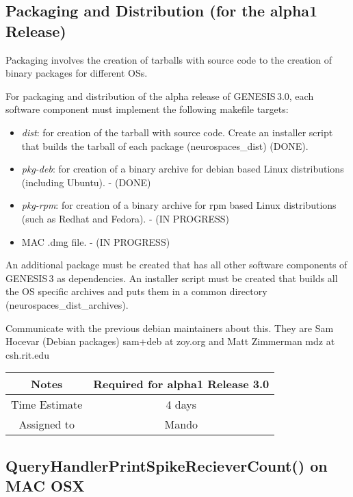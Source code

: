 \documentclass[12pt]{article}
\begin{document}
\subsection{Packaging and Distribution (for the alpha1 Release)}

Packaging involves the creation of tarballs with source code to the
creation of binary packages for different OSs.

For packaging and distribution of the alpha release of GENESIS\,3.0,
each software component must implement the following makefile targets:

\begin{itemize}
\item {\it dist}: for creation of the tarball with source code.
  Create an installer script that builds the tarball of each package
  (neurospaces\_dist) (DONE).
\item {\it pkg-deb}: for creation of a binary archive for debian based
  Linux distributions (including Ubuntu). - (DONE)
\item {\it pkg-rpm}: for creation of a binary archive for rpm based Linux
  distributions (such as Redhat and Fedora). - (IN PROGRESS)
\item MAC .dmg file. - (IN PROGRESS)
\end{itemize}

An additional package must be created that has all other software
components of GENESIS\,3 as dependencies.  An installer script must
be created that builds all the OS specific archives and puts them in a
common directory (neurospaces\_dist\_archives).

Communicate with the previous debian maintainers about this.  They are
Sam Hocevar (Debian packages) sam+deb at zoy.org and Matt Zimmerman
mdz at csh.rit.edu

{
  \vspace{5mm}
  \centering
  \begin{tabular}{|c|c|}
    \hline
    Notes
    & Required for alpha1 Release 3.0 \\
    \hline
    Time Estimate
    & 4 days \\
    \hline
    Assigned to
    & Mando \\
    \hline
  \end{tabular}
}



\subsection{QueryHandlerPrintSpikeRecieverCount() on MAC OSX}
\end{document}
